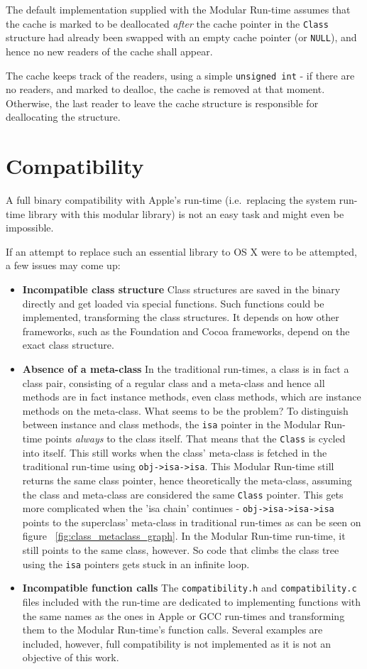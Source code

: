 The default implementation supplied with the Modular Run-time assumes that the cache is marked to be deallocated \emph{after} the cache pointer in the \verb=Class= structure had already been swapped with an empty cache pointer (or \verb=NULL=), and hence no new readers of the cache shall appear.

The cache keeps track of the readers, using a simple \verb=unsigned int= - if there are no readers, and marked to dealloc, the cache is removed at that moment. Otherwise, the last reader to leave the cache structure is responsible for deallocating the structure.


\section{Compatibility}

A full binary compatibility with Apple's run-time (i.e.\ replacing the system run-time library with this modular library) is not an easy task and might even be impossible.

If an attempt to replace such an essential library to OS X were to be attempted, a few issues may come up:

\begin{itemize}
  \item{\bf{Incompatible class structure}} Class structures are saved in the binary directly and get loaded via special functions. Such functions could be implemented, transforming the class structures. It depends on how other frameworks, such as the Foundation and Cocoa frameworks, depend on the exact class structure.
  \item{\bf{Absence of a meta-class}} In the traditional run-times, a class is in fact a class pair, consisting of a regular class and a meta-class and hence all methods are in fact instance methods, even class methods, which are instance methods on the meta-class. What seems to be the problem? To distinguish between instance and class methods, the \verb=isa= pointer in the Modular Run-time points \emph{always} to the class itself. That means that the \verb=Class= is cycled into itself. This still works when the class' meta-class is fetched in the traditional run-time using \verb=obj->isa->isa=. This Modular Run-time still returns the same class pointer, hence theoretically the meta-class, assuming the class and meta-class are considered the same \verb=Class= pointer. This gets more complicated when the 'isa chain' continues - \verb=obj->isa->isa->isa= points to the superclass' meta-class in traditional run-times as can be seen on figure ~\ref{fig:class_metaclass_graph}. In the Modular Run-time run-time, it still points to the same class, however. So code that climbs the class tree using the \verb=isa= pointers gets stuck in an infinite loop.
  \item{\bf{Incompatible function calls}} The \verb=compatibility.h= and \verb=compatibility.c= files included with the run-time are dedicated to implementing functions with the same names as the ones in Apple or GCC run-times and transforming them to the Modular Run-time's function calls. Several examples are included, however, full compatibility is not implemented as it is not an objective of this work.
\end{itemize}

